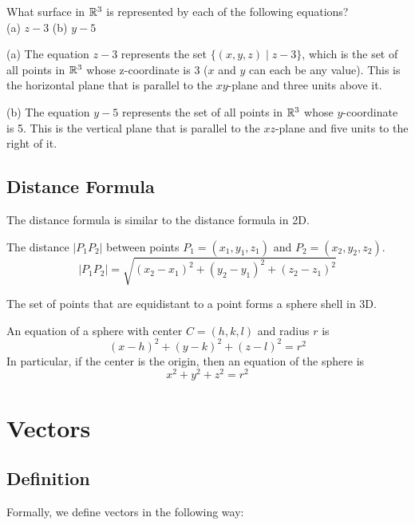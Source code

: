 \begin{example}
What surface in ${\mathbb R}^3$ is represented by each of the following equations? \\ (a) $z-3$ (b) $y-5$

(a) The equation $z-3$ represents the set $\{(x, y, z) \mid z - 3\}$, which is the set of all points in ${\mathbb R}^3$ whose z-coordinate is 3 ($x$ and $y$ can each be any value). This is the horizontal plane that is parallel to the $xy$-plane and three units above it.

(b) The equation $y-5$ represents the set of all points in ${\mathbb R}^3$ whose $y$-coordinate is 5. This is the vertical plane that is parallel to the $xz$-plane and five units to the right of it.
\end{example}

\subsection{Distance Formula}

The distance formula is similar to the distance formula in 2D.

\begin{theorem}
The distance $|P_1P_2|$ between points $P_1=(x_1,y_1,z_1)$ and $P_2=(x_2,y_2,z_2)$.
$$
|P_1P_2| = \sqrt{(x_2-x_1)^2+(y_2-y_1)^2+(z_2-z_1)^2}
$$
\end{theorem}

The set of points that are equidistant to a point forms a sphere shell in 3D.

\begin{theorem}
An equation of a sphere with center $C=(h,k,l)$ and radius $r$ is
$$
(x-h)^2+(y-k)^2+(z-l)^2 = r^2
$$
In particular, if the center is the origin, then an equation of the sphere is
$$
x^2+y^2+z^2 = r^2
$$
\end{theorem}

\section{Vectors}

\subsection{Definition}

Formally, we define vectors in the following way:

